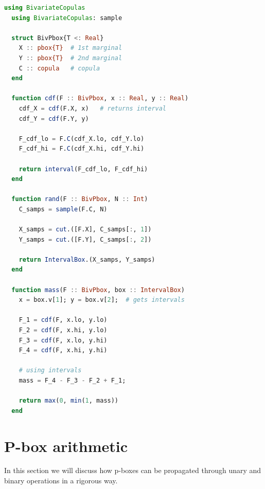 \documentclass{juliacon}
\begin{document}
\begin{lstlisting}[language = Julia]
  using BivariateCopulas
  using BivariateCopulas: sample

  struct BivPbox{T <: Real}
    X :: pbox{T}  # 1st marginal
    Y :: pbox{T}  # 2nd marginal
    C :: copula   # copula
  end

  function cdf(F :: BivPbox, x :: Real, y :: Real)
    cdf_X = cdf(F.X, x)   # returns interval
    cdf_Y = cdf(F.Y, y)

    F_cdf_lo = F.C(cdf_X.lo, cdf_Y.lo)
    F_cdf_hi = F.C(cdf_X.hi, cdf_Y.hi)

    return interval(F_cdf_lo, F_cdf_hi)
  end

  function rand(F :: BivPbox, N :: Int)
    C_samps = sample(F.C, N)

    X_samps = cut.([F.X], C_samps[:, 1])
    Y_samps = cut.([F.Y], C_samps[:, 2])

    return IntervalBox.(X_samps, Y_samps)
  end

  function mass(F :: BivPbox, box :: IntervalBox)
    x = box.v[1]; y = box.v[2];  # gets intervals

    F_1 = cdf(F, x.lo, y.lo)
    F_2 = cdf(F, x.hi, y.lo)
    F_3 = cdf(F, x.lo, y.hi)
    F_4 = cdf(F, x.hi, y.hi)

    # using intervals
    mass = F_4 - F_3 - F_2 + F_1;

    return max(0, min(1, mass))
  end
\end{lstlisting}
\section{P-box arithmetic}
\label{sec:pboxarithmetic}
In this section we will discuss how p-boxes can be propagated through unary and binary operations in a rigorous way.
\end{document}
